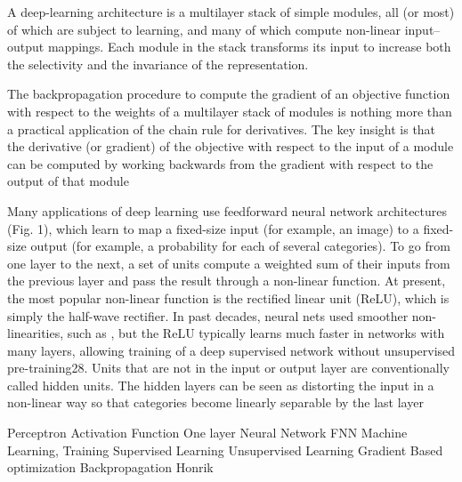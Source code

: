 A deep-learning architecture is a multilayer stack of simple modules, all (or most) of which are subject to learning, and many of which compute non-linear input–output mappings. Each module in the stack transforms its input to increase both the selectivity and the invariance of the representation.

The backpropagation procedure to compute the gradient of an objective function with respect to the weights of a multilayer stack of modules is nothing more than a practical application of the chain rule for derivatives. The key insight is that the derivative (or gradient) of the objective with respect to the input of a module can be computed by working backwards from the gradient with respect to the output of that module

Many applications of deep learning use feedforward neural network architectures (Fig. 1), which learn to map a fixed-size input (for example, an image) to a fixed-size output (for example, a probability for each of several categories). To go from one layer to the next, a set of units compute a weighted sum of their inputs from the previous layer and pass the result through a non-linear function. At present, the most popular non-linear function is the rectified linear unit (ReLU), which is simply the half-wave rectifier. In past decades, neural nets used smoother non-linearities, such as , but the ReLU typically learns much faster in networks with many layers, allowing training of a deep supervised network without unsupervised pre-training28. Units that are not in the input or output layer are conventionally called hidden units. The hidden layers can be seen as distorting the input in a non-linear way so that categories become linearly separable by the last layer 



Perceptron
Activation Function
One layer
Neural Network
FNN
Machine Learning, Training 
Supervised Learning
Unsupervised Learning
Gradient Based optimization
Backpropagation 
Honrik 